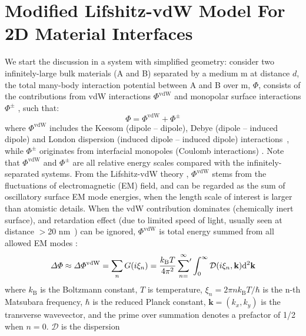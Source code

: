 \section{Modified Lifshitz-vdW Model For 2D Material Interfaces}
\label{sec:vdw-model-lifshitz}
We start the discussion in a system with simplified geometry: consider
two infinitely-large bulk materials (A and B) separated by a medium m
at distance \(d\), the total many-body interaction potential between A
and B over m, \(\Phi\), consists of the contributions from vdW
interactions \(\Phi^{\mathrm{vdW}}\) and mono\-polar surface
interactions \(\Phi^{\pm}\)
\cite{van_Oss_1987_monopolar,Van_Oss_1988}, such that:
\begin{equation}
\label{eq:vdw-phi-oss}
\Phi = \Phi^{\mathrm{vdW}} + \Phi^{\pm}
\end{equation}
where \(\Phi^{\mathrm{vdW}}\) includes the Keesom (dipole -- dipole),
Debye (dipole -- induced dipole) and London dispersion (induced dipole
-- induced dipole) interactions~\cite{Israelachvili_2011_book}, while
\(\Phi^{\pm}\) originates from interfacial monopoles (Coulomb
interactions) \cite{van_Oss_1987_monopolar}.
%
Note that $\Phi^{\mathrm{vdW}}$ and $\Phi^{\pm}$ are all relative
energy scales compared with the infinitely-separated systems.
%
From the Lifshitz-vdW theory \cite{Dzyaloshinskii_1961_lifshitz},
\(\Phi^{\mathrm{vdW}}\) stems from the fluctuations of electromagnetic
(EM) field, and can be regarded as the sum of oscillatory surface EM
mode energies, when the length scale of interest is larger than
atomistic details.
%
When the vdW contribution dominates (\ie chemically inert surface),
and retardation effect (due to limited speed of light, usually seen at
distance $>$20 nm~\cite{parsegian_van_2010_book}) can be ignored,
$\Phi^{\mathrm{vdW}}$ is total energy summed from all allowed EM modes
\cite{Li_2005_diele}:
\begin{equation}
\label{eq:Phi-EM}
\Delta \Phi \approx \Delta \Phi^{\mathrm{vdW}}
= \sum_{n} G(i \xi_{n})
= \frac{k_{\mathrm{B}}T}{4 \pi^{2}}   
 \sideset{}{'}\sum_{n=}^{\infty} \int_{0}^{\infty} \mathcal{D}(i \xi_{n}, \mathbf{k}) 
\mathrm{d}^{2} \mathbf{k}
\end{equation}
where \(k_{\mathrm{B}}\) is the Boltzmann constant, \(T\) is temperature,
\(\xi_{n} = 2 \pi n k_{\mathrm{B}} T / \hbar\) is the n-th Matsubara
frequency, \(\hbar\) is the reduced Planck constant, \(\mathbf{k}=(k_{x},
k_{y})\) is the transverse wavevector, and the prime over summation
denotes a prefactor of 1/2 when \(n=0\). \(\mathcal{D}\) is the dispersion
